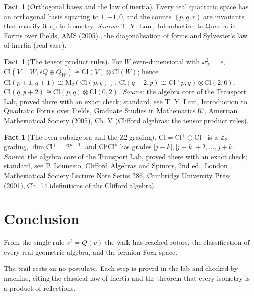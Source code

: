 \documentclass[11pt]{article}
\theoremstyle{definition}
\newtheorem{fact}[theorem]{Fact}
\theoremstyle{plain}
\providecommand{\Cl}{}\renewcommand{\Cl}{\mathrm{Cl}}
\providecommand{\Mat}{}\renewcommand{\Mat}{\mathrm{M}}
\begin{document}
\begin{fact}[Orthogonal bases and the law of inertia]\label{c:std-algebra.sylvester-inertia}
Every real quadratic space has an orthogonal basis squaring to $1, -1, 0$, and the counts $(p, q, r)$ are invariants that classify it up to isometry.
\emph{Source:} T. Y. Lam, Introduction to Quadratic Forms over Fields, AMS (2005)., the diagonalisation of forms and Sylvester's law of inertia (real case).
\end{fact}

\begin{fact}[The tensor product rules]\label{c:std-algebra.tensor-rules}
For $W$ even-dimensional with $\omega_W^{2} = \epsilon$, $\Cl(V \perp W, \epsilon Q \oplus Q_W) \cong \Cl(V) \otimes \Cl(W)$; hence $\Cl(p{+}1,q{+}1) \cong \Mat_2(\Cl(p,q))$, $\Cl(q{+}2,p) \cong \Cl(p,q) \otimes \Cl(2,0)$, $\Cl(q,p{+}2) \cong \Cl(p,q) \otimes \Cl(0,2)$.
\emph{Source:} the algebra core of the Transport Lab, proved there with an exact check; standard, see T. Y. Lam, Introduction to Quadratic Forms over Fields, Graduate Studies in Mathematics 67, American Mathematical Society (2005), Ch. V (Clifford algebras: the tensor product rules).
\end{fact}

\begin{fact}[The even subalgebra and the Z2 grading]\label{c:std-algebra.z2-grading}
$\Cl = \Cl^{+} \oplus \Cl^{-}$ is a $\mathbb{Z}_2$-grading, $\dim \Cl^{+} = 2^{n-1}$, and $\Cl^{j}\Cl^{k}$ has grades $|j-k|, |j-k|+2, \dots, j+k$.
\emph{Source:} the algebra core of the Transport Lab, proved there with an exact check; standard, see P. Lounesto, Clifford Algebras and Spinors, 2nd ed., London Mathematical Society Lecture Note Series 286, Cambridge University Press (2001), Ch. 14 (definitions of the Clifford algebra).
\end{fact}

\section*{Conclusion}
From the single rule $v^{2} = Q(v)$ the walk has reached rotors, the classification of every real geometric algebra, and the fermion Fock space.

The trail rests on no postulate. Each step is proved in the lab and checked by machine, citing the classical law of inertia and the theorem that every isometry is a product of reflections.
\end{document}
